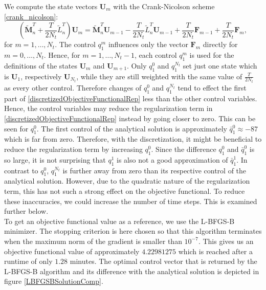 We compute the state vectors $\mathbf{U}_m$ with the Crank-Nicolson scheme \eqref{crank_nicolson}:
\begin{equation*}
\left(\tilde{\mathbf{M}}_n^T + \frac{T}{2N_t} \tilde{L}_n^T\right) \mathbf{U}_m = \tilde{\mathbf{M}}_n^T\mathbf{U}_{m-1} - \frac{T}{2N_t} \tilde{L}_n^T \mathbf{U}_{m-1} + \frac{T}{2N_t} \mathbf{F}_{m-1} + \frac{T}{2N_t} \mathbf{F}_m,
\end{equation*}
for $m=1,\dotsc,N_t$. The control $q^m_1$ influences only the vector $\mathbf{F}_m$ directly for $m=0,\dotsc,N_t$. Hence, for $m=1,\dotsc,N_t-1$, each control $q^m_1$ is used for the definitions of the states $\mathbf{U}_m$ and $\mathbf{U}_{m+1}$. Only $q^0_1$ and $q^{N_t}_1$ set just one state which is $\mathbf{U}_1$, respectively $\mathbf{U}_{N_t}$, while they are still weighted with the same value of $\frac{T}{2N_t}$ as every other control. Therefore changes of $q^0_1$ and $q^{N_t}_1$ tend to effect the first part of \eqref{discretizedObjectiveFunctionalRep} less than the other control variables. Hence, the control variables may reduce the regularization term in \eqref{discretizedObjectiveFunctionalRep} instead by going closer to zero. This can be seen for $q^0_1$. The first control of the analytical solution is approximately $\bar{q}^0_1\approx-87$ which is far from zero. Therefore, with the discretization, it might be beneficial to reduce the regularization term by increasing $q^0_1$. Since the difference $q^0_1$ and $\bar{q}^0_1$ is so large, it is not surprising that $q^1_1$ is also not a good approximation of $\bar{q}^1_1$. In contrast to $q^0_1$, $q^{N_t}_1$ is further away from zero than its respective control of the analytical solution. However, due to the quadratic nature of the regularization term, this has not such a strong effect on the objective functional. To reduce these inaccuracies, we could increase the number of time steps. This is examined further below.\\

To get an objective functional value as a reference, we use the L-BFGS-B minimizer. The stopping criterion is here chosen so that this algorithm terminates when the maximum norm of the gradient is smaller than $10^{-7}$. This gives us an objective functional value of approximately $4.22981275$ which is reached after a runtime of only $1.28$ minutes. The optimal control vector that is returned by the L-BFGS-B algorithm and its difference with the analytical solution is depicted in figure \ref{LBFGSBSolutionComp}.\\

